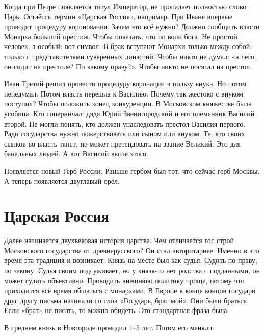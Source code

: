 Когда при Петре появляется титул Император, не пропадает полностью слово Царь. Остаётся термин «Царская Россия», например. При Иване впервые проводят процедуру коронования. Зачем это всё нужно? Должно сообщить власти Монарха больший престиж. Чтобы показать, что по воли бога. Не простой человек, а особый: вот символ. В брак вступают Монархи только между собой: только с представителями суверенных династий. Чтобы никто не думал: «а чего он сидит на престоле? По какому праву?». Чтобы никто не посягал на престол.

Иван Третий решил провести процедуру коронации в пользу внука. Но потом пепедумал. Потом власть перешла к Василию. Почему так жестоко с внуком поступил? Чтобы положить конец конкуренции. В Московском княжестве была усобица. Кто соперничал: дядя Юрий Звенигородский и его племянник Василий второй. Не могли понять, кто должен унаследовать престол Василия первого. Ради государства нужно пожерствовать или сыном или внуком. Те, кто своих сынков во власть тянет, не может претендовать на звание Великий. Это для банальных людей. А вот Василий выше этого.

Появляется новый Герб России. Раньше гербом был тот, что сейчас герб Москвы. А теперь появляется двуглавый орёл.

\section{Царская Россия}
Далее начинается двухвековая история царства. Чем отличается гос строй Московского государства от древнерусского? Он стал авторитарнее. Именно в это время эта традиция и возникает. Князь на месте был как судья. Судить по праву, по закону. Судья своим подсуживает, но у князя-то нет родства с подданными, он может судить объективно. Проводить внешнюю политику проще, потому что приходится всё время общаться с монархами. В Европе в конце концов государи друг другу письма начинали со слов «Государь, брат мой». Они были браться. Если «брат» не писать, то можно обидеть. Это стандартная фраза была.

В среднем князь в Новгороде проводил 4--5 лет. Потом его меняли. 

